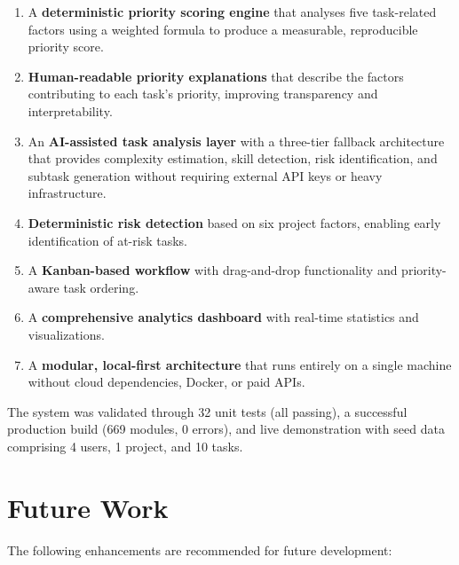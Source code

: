 \documentclass[12pt,a4paper,oneside]{report}
\begin{document}
\begin{enumerate}[noitemsep]
  \item A \textbf{deterministic priority scoring engine} that analyses five task-related factors using a weighted formula to produce a measurable, reproducible priority score.
  \item \textbf{Human-readable priority explanations} that describe the factors contributing to each task's priority, improving transparency and interpretability.
  \item An \textbf{AI-assisted task analysis layer} with a three-tier fallback architecture that provides complexity estimation, skill detection, risk identification, and subtask generation without requiring external API keys or heavy infrastructure.
  \item \textbf{Deterministic risk detection} based on six project factors, enabling early identification of at-risk tasks.
  \item A \textbf{Kanban-based workflow} with drag-and-drop functionality and priority-aware task ordering.
  \item A \textbf{comprehensive analytics dashboard} with real-time statistics and visualizations.
  \item A \textbf{modular, local-first architecture} that runs entirely on a single machine without cloud dependencies, Docker, or paid APIs.
\end{enumerate}

The system was validated through 32 unit tests (all passing), a successful production build (669 modules, 0 errors), and live demonstration with seed data comprising 4 users, 1 project, and 10 tasks.


\chapter{Future Work}

The following enhancements are recommended for future development:
\end{document}
